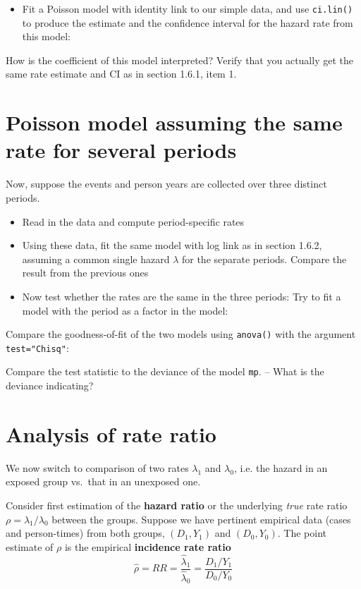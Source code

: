 \documentclass[
]{book}
\providecommand{\tightlist}{%
  \setlength{\itemsep}{0pt}\setlength{\parskip}{0pt}}
\begin{document}
\begin{itemize}
\tightlist
\item
  Fit a Poisson model with identity link to our simple data, and
  use \texttt{ci.lin()} to produce the estimate and the
  confidence interval for the hazard rate from this model:
\end{itemize}

How is the coefficient of this model interpreted?
Verify that you actually get the same rate estimate and CI as in section 1.6.1, item 1.

\section{Poisson model assuming the same rate for several periods}\label{poisson-model-assuming-the-same-rate-for-several-periods}

Now, suppose the events and person years are collected over three distinct periods.

\begin{itemize}
\item
  Read in the data and compute period-specific rates
\item
  Using these data,
  fit the same model with log link as in section 1.6.2, assuming a common single hazard \(\lambda\)
  for the separate periods. Compare the result from the previous ones
\item
  Now test whether the rates are the same in the three periods:
  Try to fit a model with the period as a factor in the model:
\end{itemize}

Compare the goodness-of-fit of the two models using \texttt{anova()} with the argument
\texttt{test="Chisq"}:

Compare the test statistic to the deviance of the model \texttt{mp}.
-- What is the deviance indicating?

\section{Analysis of rate ratio}\label{analysis-of-rate-ratio}

We now switch to comparison of two rates \(\lambda_1\) and \(\lambda_0\), i.e.
the hazard in an exposed group vs.~that in an unexposed one.

Consider first estimation of the \textbf{hazard ratio} or the underlying \emph{true} rate ratio
\(\rho = \lambda_1/\lambda_0\) between the groups. Suppose we have
pertinent empirical data (cases and person-times) from both groups,
\((D_1,Y_1)\) and \((D_0,Y_0)\). The point estimate of \(\rho\) is the
empirical \textbf{incidence rate ratio}
\[
\widehat{\rho} = RR = \frac{\widehat\lambda_1}{\widehat\lambda_0} = \frac{D_1/Y_1}{D_0/Y_0}
\]
\end{document}
